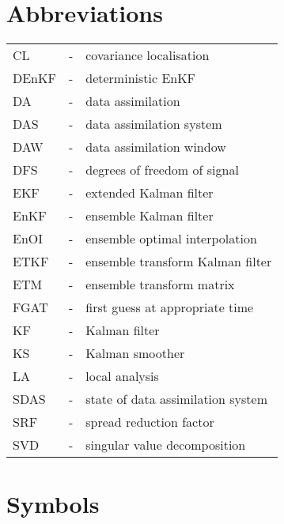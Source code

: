 \documentclass[11pt]{report}
\begin{document}
\clearpage

\chapter*{Abbreviations}

\begin{tabular}{lll}
  CL &-& covariance localisation \\
  DEnKF &-& deterministic EnKF \\
  DA &-& data assimilation \\
  DAS &-& data assimilation system \\
  DAW &-& data assimilation window \\
  DFS &-& degrees of freedom of signal \\
  EKF &-& extended Kalman filter \\
  EnKF &-& ensemble Kalman filter \\
  EnOI &-& ensemble optimal interpolation \\
  ETKF &-& ensemble transform Kalman filter \\
  ETM &-& ensemble transform matrix \\
  FGAT &-& first guess at appropriate time \\
  KF &-& Kalman filter \\
  KS &-& Kalman smoother \\
  LA &-& local analysis \\
  SDAS &-& state of data assimilation system \\
  SRF &-& spread reduction factor \\
  SVD &-& singular value decomposition \\
\end{tabular}

\clearpage

\chapter*{Symbols}
\end{document}
